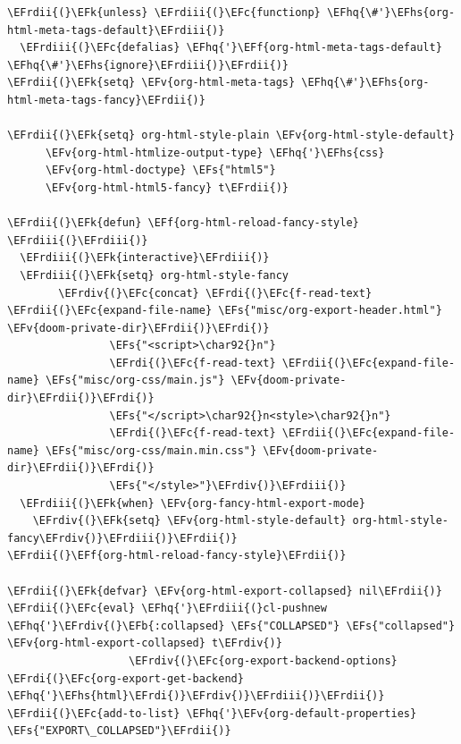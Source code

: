 \documentclass{scrartcl}
\newcommand{\EFk}[1]{\textcolor{EFk}{#1}} %
\newcommand{\EFs}[1]{\textcolor{EFs}{#1}} %
\newcommand{\EFb}[1]{\textcolor{EFb}{#1}} %
\newcommand{\EFc}[1]{\textcolor{EFc}{#1}} %
\newcommand{\EFv}[1]{\textcolor{EFv}{#1}} %
\newcommand{\EFf}[1]{\textcolor{EFf}{#1}} %
\newcommand{\EFhq}[1]{#1} %
\newcommand{\EFhs}[1]{#1} %
\newcommand{\EFrdi}[1]{#1} %
\newcommand{\EFrdii}[1]{#1} %
\newcommand{\EFrdiii}[1]{#1} %
\newcommand{\EFrdiv}[1]{#1} %
\begin{document}
\begin{Code}
\begin{Verbatim}[]
\EFrdii{(}\EFk{unless} \EFrdiii{(}\EFc{functionp} \EFhq{\#'}\EFhs{org-html-meta-tags-default}\EFrdiii{)}
  \EFrdiii{(}\EFc{defalias} \EFhq{'}\EFf{org-html-meta-tags-default} \EFhq{\#'}\EFhs{ignore}\EFrdiii{)}\EFrdii{)}
\EFrdii{(}\EFk{setq} \EFv{org-html-meta-tags} \EFhq{\#'}\EFhs{org-html-meta-tags-fancy}\EFrdii{)}

\EFrdii{(}\EFk{setq} org-html-style-plain \EFv{org-html-style-default}
      \EFv{org-html-htmlize-output-type} \EFhq{'}\EFhs{css}
      \EFv{org-html-doctype} \EFs{"html5"}
      \EFv{org-html-html5-fancy} t\EFrdii{)}

\EFrdii{(}\EFk{defun} \EFf{org-html-reload-fancy-style} \EFrdiii{(}\EFrdiii{)}
  \EFrdiii{(}\EFk{interactive}\EFrdiii{)}
  \EFrdiii{(}\EFk{setq} org-html-style-fancy
        \EFrdiv{(}\EFc{concat} \EFrdi{(}\EFc{f-read-text} \EFrdii{(}\EFc{expand-file-name} \EFs{"misc/org-export-header.html"} \EFv{doom-private-dir}\EFrdii{)}\EFrdi{)}
                \EFs{"<script>\char92{}n"}
                \EFrdi{(}\EFc{f-read-text} \EFrdii{(}\EFc{expand-file-name} \EFs{"misc/org-css/main.js"} \EFv{doom-private-dir}\EFrdii{)}\EFrdi{)}
                \EFs{"</script>\char92{}n<style>\char92{}n"}
                \EFrdi{(}\EFc{f-read-text} \EFrdii{(}\EFc{expand-file-name} \EFs{"misc/org-css/main.min.css"} \EFv{doom-private-dir}\EFrdii{)}\EFrdi{)}
                \EFs{"</style>"}\EFrdiv{)}\EFrdiii{)}
  \EFrdiii{(}\EFk{when} \EFv{org-fancy-html-export-mode}
    \EFrdiv{(}\EFk{setq} \EFv{org-html-style-default} org-html-style-fancy\EFrdiv{)}\EFrdiii{)}\EFrdii{)}
\EFrdii{(}\EFf{org-html-reload-fancy-style}\EFrdii{)}

\EFrdii{(}\EFk{defvar} \EFv{org-html-export-collapsed} nil\EFrdii{)}
\EFrdii{(}\EFc{eval} \EFhq{'}\EFrdiii{(}cl-pushnew \EFhq{'}\EFrdiv{(}\EFb{:collapsed} \EFs{"COLLAPSED"} \EFs{"collapsed"} \EFv{org-html-export-collapsed} t\EFrdiv{)}
                   \EFrdiv{(}\EFc{org-export-backend-options} \EFrdi{(}\EFc{org-export-get-backend} \EFhq{'}\EFhs{html}\EFrdi{)}\EFrdiv{)}\EFrdiii{)}\EFrdii{)}
\EFrdii{(}\EFc{add-to-list} \EFhq{'}\EFv{org-default-properties} \EFs{"EXPORT\_COLLAPSED"}\EFrdii{)}


\end{Verbatim}
\end{Code}
\end{document}
